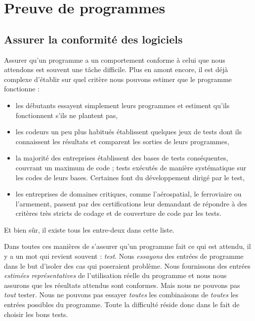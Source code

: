 \documentclass[12pt,francais,]{scrbook}
\providecommand{\tightlist}{%
  \setlength{\itemsep}{0pt}\setlength{\parskip}{0pt}}
\begin{document}
\section{Preuve de programmes}\label{preuve-de-programmes}

\subsection{Assurer la conformité des
logiciels}\label{assurer-la-conformituxe9-des-logiciels}

Assurer qu'un programme a un comportement conforme à celui que nous
attendons est souvent une tâche difficile. Plus en amont encore, il est
déjà complexe d'établir sur quel critère nous pouvons estimer que le
programme \og{}fonctionne\fg{} :

\begin{itemize}
\tightlist
\item
  les débutants \og{}essayent\fg{} simplement leurs programmes et estiment
  qu'ils fonctionnent s'ils ne plantent pas,
\item
  les codeurs un peu plus habitués établissent quelques jeux de tests
  dont ils connaissent les résultats et comparent les sorties de leurs
  programmes,
\item
  la majorité des entreprises établissent des bases de tests
  conséquentes, couvrant un maximum de code ; tests exécutés de manière
  systématique sur les codes de leurs bases. Certaines font du
  développement dirigé par le test,
\item
  les entreprises de domaines critiques, comme l'aérospatial, le
  ferroviaire ou l'armement, passent par des certifications leur
  demandant de répondre à des critères très stricts de codage et de
  couverture de code par les tests.
\end{itemize}

Et bien sûr, il existe tous les \og{}entre-deux\fg{} dans cette liste.

Dans toutes ces manières de s'assurer qu'un programme fait ce qui est
attendu, il y a un mot qui revient souvent : \emph{test}. Nous
\emph{essayons} des entrées de programme dans le but d'isoler des cas
qui poseraient problème. Nous fournissons des entrées \emph{estimées
représentatives} de l'utilisation réelle du programme et nous nous
assurons que les résultats attendus sont conformes. Mais nous ne pouvons
pas \emph{tout} tester. Nous ne pouvons pas essayer \emph{toutes} les
combinaisons de \emph{toutes} les entrées possibles du programme. Toute
la difficulté réside donc dans le fait de choisir les bons tests.
\end{document}
